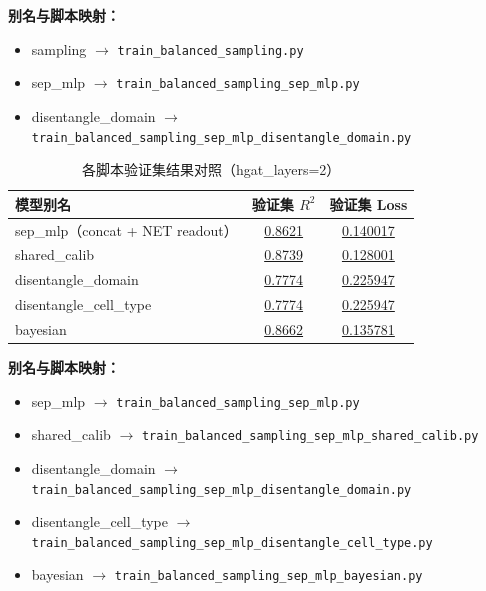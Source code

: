 \documentclass[12pt,a4paper]{ctexart}
\begin{document}
\noindent\textbf{别名与脚本映射：}
\begin{itemize}
	\item sampling $\rightarrow$ \texttt{train\_balanced\_sampling.py}
	\item sep\_mlp $\rightarrow$ \texttt{train\_balanced\_sampling\_sep\_mlp.py}
	\item disentangle\_domain $\rightarrow$ \texttt{train\_balanced\_sampling\_sep\_mlp\_disentangle\_domain.py}
	
	
\end{itemize}

\begin{table}[htbp]
\centering
\small
\setlength{\tabcolsep}{10pt}
\begin{tabular}{>{\raggedright\arraybackslash}p{}cc}
\toprule
模型别名 & 验证集 $R^2$ & 验证集 Loss \\
\midrule
sep\_mlp（concat + NET readout） & \underline{0.8621} & \underline{0.140017} \\
shared\_calib & \underline{0.8739} & \underline{0.128001} \\
disentangle\_domain & \underline{0.7774} & \underline{0.225947} \\
disentangle\_cell\_type & \underline{0.7774} & \underline{0.225947} \\
bayesian  & \underline{0.8662} & \underline{0.135781} \\           
\bottomrule
\end{tabular}
\caption{各脚本验证集结果对照（hgat\_layers=2）}
\end{table}

\noindent\textbf{别名与脚本映射：}
\begin{itemize}
  \item sep\_mlp $\rightarrow$ \texttt{train\_balanced\_sampling\_sep\_mlp.py}
  \item shared\_calib $\rightarrow$ \texttt{train\_balanced\_sampling\_sep\_mlp\_shared\_calib.py}
  \item disentangle\_domain $\rightarrow$ \texttt{train\_balanced\_sampling\_sep\_mlp\_disentangle\_domain.py}
  \item disentangle\_cell\_type $\rightarrow$ \texttt{train\_balanced\_sampling\_sep\_mlp\_disentangle\_cell\_type.py}
  \item bayesian $\rightarrow$ \texttt{train\_balanced\_sampling\_sep\_mlp\_bayesian.py}
\end{itemize}
\end{document}
